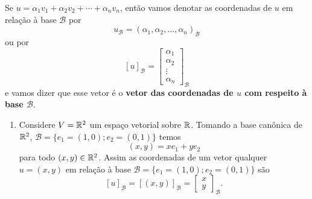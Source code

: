 \begin{notacao}
  Se $u = \alpha_1v_1 + \alpha_2v_2 + \cdots + \alpha_nv_n$,  então vamos denotar as coordenadas de $u$  em relação à base $\mathcal{B}$ por
  \[
    u_\mathcal{B} = (\alpha_1, \alpha_2, \dots, \alpha_n)_\mathcal{B}
  \]
  ou por
  \[
    [u]_\mathcal{B} = \begin{bmatrix}\alpha_1\\\alpha_2\\ \vdots\\ \alpha_n\end{bmatrix}_\mathcal{B}
  \]
 e vamos dizer que esse vetor  é o \textbf{vetor das coordenadas de $u$ com respeito à base $\mathcal{B}$}.
\end{notacao}

\begin{exemplos}
  \begin{enumerate}
    \item Considere $V = \mathbb{R}^2$ um espaço vetorial sobre $\mathbb{R}$. Tomando a base canônica de $\mathbb{R}^2$, $\mathcal{B} = \{e_1 = (1, 0); e_2 = (0, 1)\}$ temos
      \[
        (x, y) = xe_1 + ye_2
      \]
      para todo $(x, y) \in \mathbb{R}^2$. Assim as coordenadas de um vetor qualquer $u = (x, y)$ em relação à base $\mathcal{B} = \{e_1 = (1, 0); e_2 = (0, 1)\}$ são
      \[
        [u]_\mathcal{B} = [(x, y)]_\mathcal{B} = \begin{bmatrix}x\\y\end{bmatrix}_\mathcal{B}.
      \]


\end{enumerate}
\end{exemplos}
